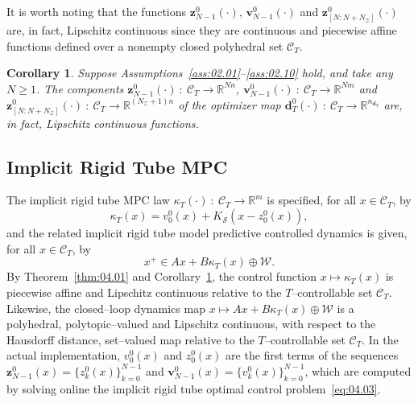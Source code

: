 \documentclass[twocolumn]{autart}
\newtheorem{corollary}{Corollary}
\newcommand{\mb}[1]{\mathbb{#1}}
\newcommand{\mc}[1]{\mathcal{#1}}
\newcommand{\mbf}[1]{\mathbf{#1}}
\newcommand{\bb}{\left(\cdot\right)}
\newcommand{\R}{\mb{R}}
\numberwithin{equation}{section}
\begin{document}
It is worth noting that the functions $\mbf{z}_{N-1}^0\bb$, $\mbf{v}_{N-1}^0\bb$ and  $\mbf{z}_{[N:N+N_\mc{Z}]}^0\bb$ are, in fact, Lipschitz continuous since they are continuous and piecewise affine functions defined over a nonempty closed polyhedral set $\mc{C}_T$.
\begin{corollary}
\label{cor:04.01}
Suppose Assumptions~\ref{ass:02.01}--\ref{ass:02.10} hold, and take any $N\ge 1$.   The components $\mbf{z}_{N-1}^0\bb\ :\ \mc{C}_T\rightarrow \R^{Nn}$, $\mbf{v}_{N-1}^0\bb\ :\ \mc{C}_T\rightarrow \R^{Nm}$ and  $\mbf{z}_{[N:N+N_\mc{Z}]}^0\bb\ :\ \mc{C}_T\rightarrow \R^{(N_\mc{Z}+1)n}$ of the optimizer map $\mbf{d}_T^0\bb\ :\  \mc{C}_T\rightarrow \R^{n_{\mbf{d}_T}}$ are, in fact, Lipschitz continuous  functions.
\end{corollary}



\subsection{Implicit Rigid Tube MPC}
\label{sec:04.03}
The implicit rigid tube MPC law $\kappa_T\bb\ :\ \mc{C}_T\rightarrow \R^m$ is specified, for all $x\in\mc{C}_T$, by
\begin{equation}
\label{eq:04.08}
\kappa_T(x)=v_0^0(x)+K_\mc{S}(x-z_0^0(x)),
\end{equation}
and the related implicit rigid tube model predictive controlled dynamics is given, for all $x\in\mc{C}_T$, by
\begin{equation}
\label{eq:04.09}
x^+\in Ax+B\kappa_T(x)\oplus \mc{W}.
\end{equation}
By Theorem~\ref{thm:04.01} and Corollary~\ref{cor:04.01}, the control function $x\mapsto \kappa_T(x)$ is piecewise affine and Lipschitz continuous relative to the $T$--controllable set $\mc{C}_T$. Likewise, the closed--loop dynamics map $x\mapsto Ax+B\kappa_T(x)\oplus \mc{W}$ is a polyhedral, polytopic--valued and Lipschitz continuous, with respect to the Hausdorff distance, set--valued map relative to the $T$--controllable set $\mc{C}_T$.  In the actual implementation, $v_0^0(x)$ and $z_0^0(x)$ are the first terms of the sequences $\mbf{z}_{N-1}^0(x)=\{z_k^0(x)\}_{k=0}^{N-1}$ and $\mbf{v}_{N-1}^0(x)=\{v_k^0(x)\}_{k=0}^{N-1}$, which are computed by solving online the implicit rigid tube optimal control problem~\eqref{eq:04.03}.
\end{document}
